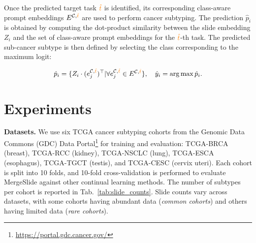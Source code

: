 \documentclass[10pt,twocolumn,letterpaper]{article}
\begin{document}
\noindent Once the predicted target task $\textcolor{orange}{\hat{t}}$ is identified, its corresponding class-aware prompt embeddings $E^{\mathcal{C},\textcolor{orange}{\hat{t}}}$ are used to perform cancer subtyping. The prediction $\hat{p}_i$ is obtained by computing the dot-product similarity between the slide embedding $Z_i$ and the set of class-aware prompt embeddings for the $\textcolor{orange}{\hat{t}}$-th task. The predicted sub-cancer subtype is then defined by selecting the class corresponding to the maximum logit:

\begin{equation}
\hat{p}_i = \{Z_i \cdot (e^{\mathcal{C},\textcolor{orange}{\hat{t}}}_{j})^\top\vert\forall e^{\mathcal{C},\textcolor{orange}{\hat{t}}}_{j}\in E^{\mathcal{C},{\textcolor{orange}{\hat{t}}}}\}, \quad \hat{y}_i = \arg\max \hat{p}_i.
\end{equation}

\section{Experiments}
\label{sec:experiments}
\noindent\textbf{Datasets.} We use six TCGA cancer subtyping cohorts from the Genomic Data Commons (GDC) Data Portal\footnote[2]{\url{https://portal.gdc.cancer.gov/}} for training and evaluation: TCGA-BRCA (breast), TCGA-RCC (kidney), TCGA-NSCLC (lung), TCGA-ESCA (esophagus), TCGA-TGCT (testis), and TCGA-CESC (cervix uteri). Each cohort is split into 10 folds, and 10-fold cross-validation is performed to evaluate MergeSlide against other continual learning methods. The number of subtypes per cohort is reported in Tab.~\ref{tab:slide_counts}. Slide counts vary across datasets, with some cohorts having abundant data (\textit{common cohorts}) and others having limited data (\textit{rare cohorts}).
\end{document}
